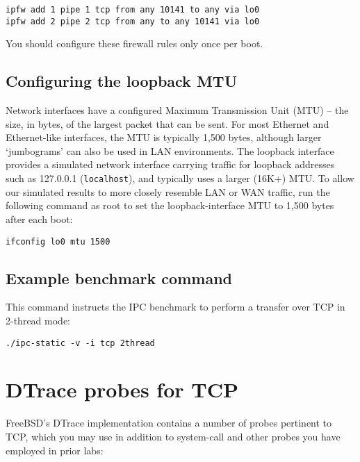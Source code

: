 \documentclass[a4paper,10pt]{article}
\begin{document}
\begin{verbatim}
ipfw add 1 pipe 1 tcp from any 10141 to any via lo0
ipfw add 2 pipe 2 tcp from any to any 10141 via lo0
\end{verbatim}

\noindent
You should configure these firewall rules only once per boot.

\subsection*{Configuring the loopback MTU}

Network interfaces have a configured Maximum Transmission Unit (MTU) -- the
size, in bytes, of the largest packet that can be sent.
For most Ethernet and Ethernet-like interfaces, the MTU is typically 1,500
bytes, although larger `jumbograms' can also be used in LAN environments.
The loopback interface provides a simulated network interface carrying
traffic for loopback addresses such as 127.0.0.1 (\texttt{localhost}), and
typically uses a larger (16K+) MTU.
To allow our simulated results to more closely resemble LAN or WAN traffic,
run the following command as root to set the loopback-interface MTU to 1,500
bytes after each boot:

\begin{verbatim}
ifconfig lo0 mtu 1500
\end{verbatim}

\subsection*{Example benchmark command}

This command instructs the IPC benchmark to perform a transfer over TCP in
2-thread mode:

\begin{verbatim}
./ipc-static -v -i tcp 2thread
\end{verbatim}

\section*{DTrace probes for TCP}

FreeBSD's DTrace implementation contains a number of probes pertinent to TCP,
which you may use in addition to system-call and other probes you have
employed in prior labs:
\end{document}
